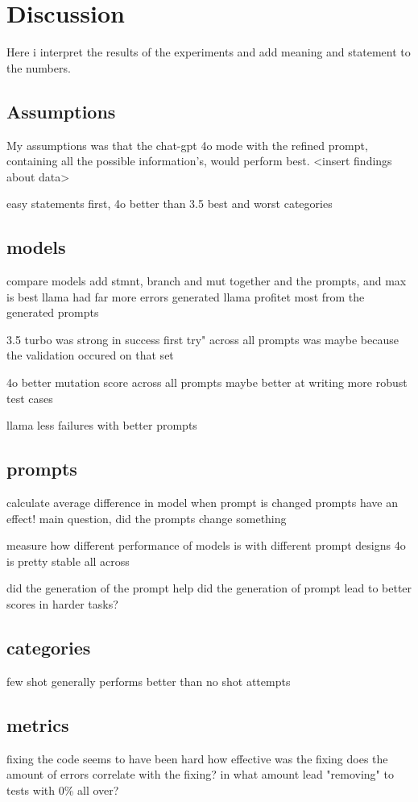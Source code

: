 \documentclass[a4paper,11pt,oneside]{memoir}
\begin{document}
\chapter{Discussion}
Here i interpret the results of the experiments and add meaning and statement to the numbers.
\label{Discussion}
\section{Assumptions}

My assumptions was that the chat-gpt 4o mode with the refined prompt, containing all the possible information's, would perform best.
<insert findings about data>

easy statements first, 4o better than 3.5
best and worst categories

\section{models}
compare models
    add stmnt, branch and mut together and the prompts, and max is best
    llama had far more errors generated
    llama profitet most from the generated prompts

3.5 turbo was strong in success first try" across all prompts
    was maybe because the validation occured on that set

4o better mutation score across all prompts
    maybe better at writing more robust test cases


llama less failures with better prompts

\section{prompts}
calculate average difference in model when prompt is changed 
prompts have an effect!
main question, did the prompts change something

measure how different performance of models is with different prompt designs
    4o is pretty stable all across

did the generation of the prompt help
    did the generation of prompt lead to better scores in harder tasks?
    
\section{categories}
few shot generally performs better than no shot attempts

\section{metrics}
fixing the code seems to have been hard
how effective was the fixing
    does the amount of errors correlate with the fixing?
    in what amount lead "removing" to tests with 0\% all over?
\end{document}
